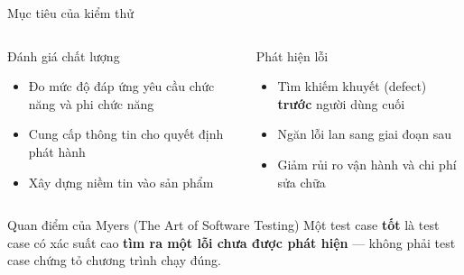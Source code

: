 \documentclass[aspectratio=169,12pt]{beamer}
\begin{document}
\begin{frame}{Mục tiêu của kiểm thử}
  \begin{columns}
    \begin{block}{Đánh giá chất lượng}
      \begin{itemize}
        \item Đo mức độ đáp ứng yêu cầu chức năng và phi chức năng
        \item Cung cấp thông tin cho quyết định phát hành
        \item Xây dựng niềm tin vào sản phẩm
      \end{itemize}
    \end{block}

    \begin{block}{Phát hiện lỗi}
      \begin{itemize}
        \item Tìm khiếm khuyết (defect) \textbf{trước} người dùng cuối
        \item Ngăn lỗi lan sang giai đoạn sau
        \item Giảm rủi ro vận hành và chi phí sửa chữa
      \end{itemize}
    \end{block}
  \end{columns}

  \vspace{0.5em}
  \begin{exampleblock}{Quan điểm của Myers (The Art of Software Testing) \cite{myers}}
    Một test case \textbf{tốt} là test case có xác suất cao \textbf{tìm ra một lỗi
    chưa được phát hiện} --- không phải test case chứng tỏ chương trình chạy đúng.
  \end{exampleblock}
\end{frame}
\end{document}

